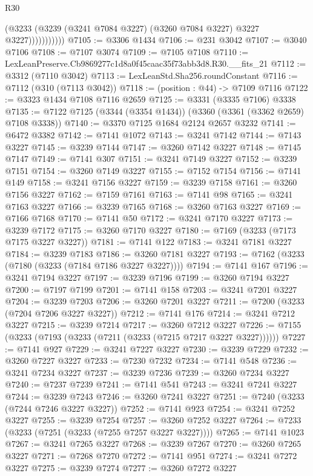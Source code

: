\begin{lexlean}{R30}
\begin{coremodule}
                      (@3233 (@3239 (@3241 @7084 @3227) (@3260 @7084 @3227) @3227 @3227)))))))))))
@7105 := @3306 @1434
@7106 := @231 @3042
@7107 := @3040 @7106
@7108 := @7107 @3074
@7109 := @7105 @7108
@7110 := LexLeanPreserve.Cb9869277c1d8a0f45caac35f73abb3d8.R30.__fits_21
@7112 := @3312 (@7110 @3042)
@7113 := LexLeanStd.Sha256.roundConstant
@7116 := @7112 (@310 (@7113 @3042))
@7118 := (position : @44) -> @7109 @7116
@7122 := @3323 @1434 @7108 @7116 @2659
@7125 := @3331 (@3335 @7106) @3338
@7135 := @7122 @7125 (@3344 (@3354 @1434)) (@3360 (@3361 (@3362 @2659) @7108 @3338))
@7140 := @3370 @7125 @1684 @2124 @2657 @3232
@7141 := @6472 @3382
@7142 := @7141 @1072
@7143 := @3241 @7142
@7144 := @7143 @3227
@7145 := @3239 @7144
@7147 := @3260 @7142 @3227
@7148 := @7145 @7147
@7149 := @7141 @307
@7151 := @3241 @7149 @3227
@7152 := @3239 @7151
@7154 := @3260 @7149 @3227
@7155 := @7152 @7154
@7156 := @7141 @149
@7158 := @3241 @7156 @3227
@7159 := @3239 @7158
@7161 := @3260 @7156 @3227
@7162 := @7159 @7161
@7163 := @7141 @98
@7165 := @3241 @7163 @3227
@7166 := @3239 @7165
@7168 := @3260 @7163 @3227
@7169 := @7166 @7168
@7170 := @7141 @50
@7172 := @3241 @7170 @3227
@7173 := @3239 @7172
@7175 := @3260 @7170 @3227
@7180 := @7169 (@3233 (@7173 @7175 @3227 @3227))
@7181 := @7141 @122
@7183 := @3241 @7181 @3227
@7184 := @3239 @7183
@7186 := @3260 @7181 @3227
@7193 := @7162 (@3233 (@7180 (@3233 (@7184 @7186 @3227 @3227))))
@7194 := @7141 @167
@7196 := @3241 @7194 @3227
@7197 := @3239 @7196
@7199 := @3260 @7194 @3227
@7200 := @7197 @7199
@7201 := @7141 @158
@7203 := @3241 @7201 @3227
@7204 := @3239 @7203
@7206 := @3260 @7201 @3227
@7211 := @7200 (@3233 (@7204 @7206 @3227 @3227))
@7212 := @7141 @176
@7214 := @3241 @7212 @3227
@7215 := @3239 @7214
@7217 := @3260 @7212 @3227
@7226 := @7155 (@3233 (@7193 (@3233 (@7211 (@3233 (@7215 @7217 @3227 @3227))))))
@7227 := @7141 @927
@7229 := @3241 @7227 @3227
@7230 := @3239 @7229
@7232 := @3260 @7227 @3227
@7233 := @7230 @7232
@7234 := @7141 @548
@7236 := @3241 @7234 @3227
@7237 := @3239 @7236
@7239 := @3260 @7234 @3227
@7240 := @7237 @7239
@7241 := @7141 @541
@7243 := @3241 @7241 @3227
@7244 := @3239 @7243
@7246 := @3260 @7241 @3227
@7251 := @7240 (@3233 (@7244 @7246 @3227 @3227))
@7252 := @7141 @923
@7254 := @3241 @7252 @3227
@7255 := @3239 @7254
@7257 := @3260 @7252 @3227
@7264 := @7233 (@3233 (@7251 (@3233 (@7255 @7257 @3227 @3227))))
@7265 := @7141 @1023
@7267 := @3241 @7265 @3227
@7268 := @3239 @7267
@7270 := @3260 @7265 @3227
@7271 := @7268 @7270
@7272 := @7141 @951
@7274 := @3241 @7272 @3227
@7275 := @3239 @7274
@7277 := @3260 @7272 @3227

\end{coremodule}
\end{lexlean}
